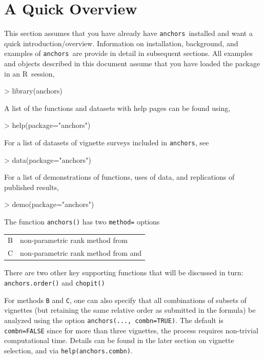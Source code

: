 \documentclass{amsart}
\newcommand{\code}[1]{{\texttt{#1}}}
\newcommand{\R}{{\normalfont\textsf{R}}{}}
\newcommand{\Ranchors}{{\texttt{anchors}}}
\begin{document}
\section{A Quick Overview}

This section assumes that you have already have \Ranchors\ installed
and want a quick introduction/overview.  Information on installation,
background, and examples of \Ranchors\ are provide in detail in
subsequent sections.  All examples and objects described in this
document assume that you have loaded the package in an \R\ session,
\begin{Schunk}
\begin{Sinput}
> library(anchors)
\end{Sinput}
\end{Schunk}

A list of the functions and datasets with help pages can be found using,
\begin{Schunk}
\begin{Sinput}
> help(package="anchors")
\end{Sinput}
\end{Schunk}
For a list of datasets of vignette surveys included in \Ranchors, see
\begin{Schunk}
\begin{Sinput}
>   data(package="anchors")
\end{Sinput}
\end{Schunk}
For a list of demonstrations of functions, uses of data, and
replications of published results,
\begin{Schunk}
\begin{Sinput}
> demo(package="anchors")
\end{Sinput}
\end{Schunk}
The function \code{anchors()} has two \code{method=} options

\begin{tabular}{ll}
  B   & non-parametric rank method from \cite{wand:2007a}\\
  C   & non-parametric rank method from \cite{king:2004} and \cite{king.wand:2007}\\
\end{tabular}

There are two other key supporting functions that will be discussed in
turn: \code{anchors.order()} and \code{chopit()}

\noindent
For methods \code{B} and \code{C}, one can also specify that all
combinations of subsets of vignettes (but retaining the same relative
order as submitted in the formula) be analyzed using the option
\code{anchors(..., combn=TRUE)}.  The default is \code{combn=FALSE}
since for more than three vignettes, the process requires non-trivial
computational time.  Details can be found in the later section on
vignette selection, and via \code{help(anchors.combn)}.
\end{document}
